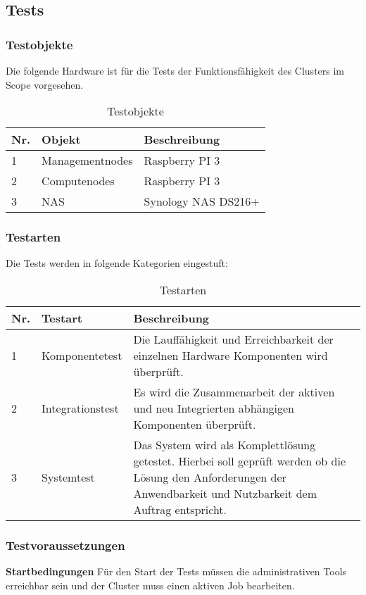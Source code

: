 \subsection{Tests}
\subsubsection{Testobjekte}
Die folgende Hardware ist für die Tests der Funktionsfähigkeit des Clusters im Scope vorgesehen.
\begin{table}[H]
\centering
\begin{tabular}{p{1cm}p{}p{7.5cm}}
\hline
\rowcolor{heading} \textbf{Nr.} & \textbf{Objekt} & \textbf{Beschreibung} \\\hline
1 & Managementnodes & Raspberry PI 3  \\\hline
2 & Computenodes & Raspberry PI 3 \\\hline
3 & NAS & Synology NAS DS216+ \\\hline
\end{tabular}
\caption{Testobjekte}
\end{table}

\subsubsection{Testarten}
Die Tests werden in folgende Kategorien eingestuft:

\begin{table}[H]
\centering
\begin{tabular}{p{1cm}p{3cm}p{12cm}}
\hline
\rowcolor{heading} \textbf{Nr.} & \textbf{Testart} & \textbf{Beschreibung} \\\hline
1 & Komponentetest & Die Lauffähigkeit und Erreichbarkeit der einzelnen Hardware Komponenten wird überprüft.  \\\hline
2 & Integrationstest & Es wird die Zusammenarbeit der aktiven und neu Integrierten abhängigen Komponenten überprüft. \\\hline
3 & Systemtest & Das System wird als Komplettlösung getestet. Hierbei soll geprüft werden ob die Lösung den Anforderungen der Anwendbarkeit und Nutzbarkeit dem Auftrag entspricht.  \\\hline
\end{tabular}
\caption{Testarten}
\end{table}

\subsubsection{Testvoraussetzungen}
\textbf{Startbedingungen}\newline
Für den Start der Tests müssen die administrativen Tools erreichbar sein und der Cluster muss einen aktiven Job bearbeiten.

